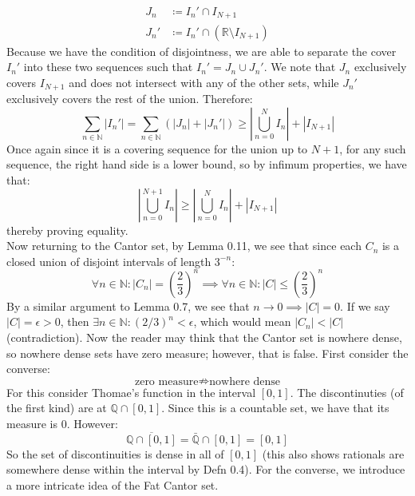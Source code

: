 \documentclass[10pt,letterpaper]{article} %
\begin{document}
\begin{align*}
  J_n &\coloneq I_n' \cap I_{N+1}\\
  J_n' &\coloneq I_n' \cap (\mathbb{R} \setminus I_{N+1})
\end{align*}
Because we have the condition of disjointness, we are able to separate the cover $I_n'$ into these two sequences such that $I_n' = J_n \cup J_n'$. We note that $J_n$ exclusively covers $I_{N+1}$ and does not intersect with any of the other sets, while $J_n'$ exclusively covers the rest of the union. Therefore:
\begin{equation*}
  \sum_{n \in \mathbb{N}} |I_n'| = \sum_{n \in \mathbb{N}}(|J_n| + |J_n'|) \geqslant \left|\bigcup_{n = 0}^{N}I_n\right| + |I_{N+1}|
\end{equation*}
Once again since it is a covering sequence for the union up to $N+1$, for any such sequence, the right hand side is a lower bound, so by infimum properties, we have that:
\begin{equation*}
  \left|\bigcup_{n = 0}^{N+1}I_n\right| \geqslant \left|\bigcup_{n= 0}^{N}I_n\right| + |I_{N+1}|
\end{equation*}
thereby proving equality.\\

Now returning to the Cantor set, by Lemma 0.11, we see that since each $C_n$ is a closed union of disjoint intervals of length $3^{-n}$:
\begin{equation*}
  \forall n \in \mathbb{N}: |C_n| = \left(\frac{2}{3}\right)^n \implies \forall n \in \mathbb{N}: |C| \leqslant \left(\frac{2}{3}\right)^n
\end{equation*}
By a similar argument to Lemma 0.7, we see that $n \xrightarrow{} 0 \implies |C| = 0$. If we say $|C| = \epsilon > 0$, then $\exists n \in \mathbb{N}: (2/3)^n < \epsilon$, which would mean $|C_n| < |C|$ (contradiction). Now the reader may think that the Cantor set is nowhere dense, so nowhere dense sets have zero measure; however, that is false. First consider the converse:
\begin{equation*}
  \text{zero measure} \nRightarrow \text{nowhere dense}
\end{equation*}
For this consider Thomae's function in the interval $[0, 1]$. The discontinuties (of the first kind) are at $\mathbb{Q} \cap [0, 1]$. Since this is a countable set, we have that its measure is $0$. However:
\begin{equation*}
  \overline{\mathbb{Q} \cap [0, 1]} = \bar{\mathbb{Q}} \cap [0, 1] = [0, 1]
\end{equation*}
So the set of discontinuities is dense in all of $[0, 1]$ (this also shows rationals are somewhere dense within the interval by Defn 0.4). For the converse, we introduce a more intricate idea of the Fat Cantor set.
\end{document}
